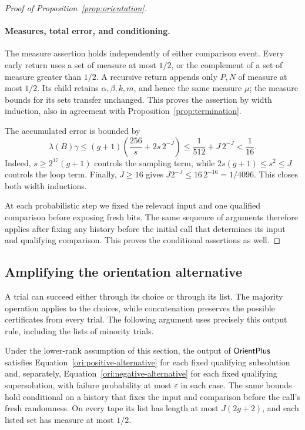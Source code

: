 \begin{proof}[Proof of Proposition~\ref{prop:orientation}]
\paragraph{Measures, total error, and conditioning.}
The measure assertion holds independently of either comparison event.
Every early return uses a set of measure at most \(1/2\), or the
complement of a set of measure greater than \(1/2\). A recursive
return appends only \(P,N\) of measure at most \(1/2\).
Its child retains \(\alpha,\beta,k,m\), and hence the same measure
\(\mu\); the measure bounds for its sets transfer unchanged.
This proves the assertion by width induction, also in agreement with
Proposition~\ref{prop:termination}.

The accumulated error is bounded by
\[
  \lambda(B)\gamma
  \leq(g+1)\left(\frac{256}{s}+2s\,2^{-J}\right)
  \leq\frac1{512}+J\,2^{-J}
  <\frac1{16}.
\]
Indeed, \(s\geq2^{17}(g+1)\) controls the sampling term, while
\(2s(g+1)\leq s^2\leq J\) controls the loop term. Finally,
\(J\geq16\) gives \(J2^{-J}\leq16\,2^{-16}=1/4096\).
This closes both width inductions.

At each probabilistic step we fixed the relevant input and one
qualified comparison before exposing fresh bits. The same sequence
of arguments therefore applies after fixing any history before the
initial call that determines its input and qualifying comparison.
This proves the conditional assertions as well.
\end{proof}

\subsection{Amplifying the orientation alternative}

A trial can succeed either through its choice or through its list.
The majority operation applies to the choices, while concatenation
preserves the possible certificates from every trial. The following
argument uses precisely this output rule, including the lists of
minority trials.

\begin{lemma}
\label{lem:orient-plus}
Under the lower-rank assumption of this section, the output of
\(\mathsf{OrientPlus}\) satisfies Equation~\eqref{ori:positive-alternative}
for each fixed qualifying subsolution and, separately,
Equation~\eqref{ori:negative-alternative} for each fixed qualifying
supersolution, with failure probability at most \(\varepsilon\)
in each case. The same bounds hold conditional on a history that
fixes the input and comparison before the call's fresh randomness.
On every tape its list has length at most \(J(2g+2)\), and each listed
set has measure at most \(1/2\).
\end{lemma}


